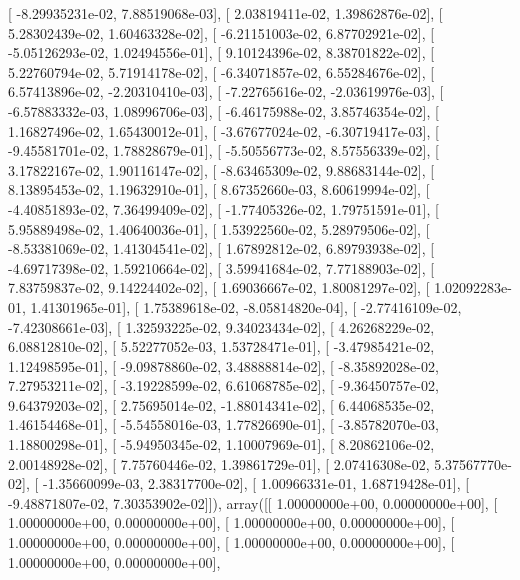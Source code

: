 \documentclass{article}
\begin{document}
       [ -8.29935231e-02,   7.88519068e-03],
       [  2.03819411e-02,   1.39862876e-02],
       [  5.28302439e-02,   1.60463328e-02],
       [ -6.21151003e-02,   6.87702921e-02],
       [ -5.05126293e-02,   1.02494556e-01],
       [  9.10124396e-02,   8.38701822e-02],
       [  5.22760794e-02,   5.71914178e-02],
       [ -6.34071857e-02,   6.55284676e-02],
       [  6.57413896e-02,  -2.20310410e-03],
       [ -7.22765616e-02,  -2.03619976e-03],
       [ -6.57883332e-03,   1.08996706e-03],
       [ -6.46175988e-02,   3.85746354e-02],
       [  1.16827496e-02,   1.65430012e-01],
       [ -3.67677024e-02,  -6.30719417e-03],
       [ -9.45581701e-02,   1.78828679e-01],
       [ -5.50556773e-02,   8.57556339e-02],
       [  3.17822167e-02,   1.90116147e-02],
       [ -8.63465309e-02,   9.88683144e-02],
       [  8.13895453e-02,   1.19632910e-01],
       [  8.67352660e-03,   8.60619994e-02],
       [ -4.40851893e-02,   7.36499409e-02],
       [ -1.77405326e-02,   1.79751591e-01],
       [  5.95889498e-02,   1.40640036e-01],
       [  1.53922560e-02,   5.28979506e-02],
       [ -8.53381069e-02,   1.41304541e-02],
       [  1.67892812e-02,   6.89793938e-02],
       [ -4.69717398e-02,   1.59210664e-02],
       [  3.59941684e-02,   7.77188903e-02],
       [  7.83759837e-02,   9.14224402e-02],
       [  1.69036667e-02,   1.80081297e-02],
       [  1.02092283e-01,   1.41301965e-01],
       [  1.75389618e-02,  -8.05814820e-04],
       [ -2.77416109e-02,  -7.42308661e-03],
       [  1.32593225e-02,   9.34023434e-02],
       [  4.26268229e-02,   6.08812810e-02],
       [  5.52277052e-03,   1.53728471e-01],
       [ -3.47985421e-02,   1.12498595e-01],
       [ -9.09878860e-02,   3.48888814e-02],
       [ -8.35892028e-02,   7.27953211e-02],
       [ -3.19228599e-02,   6.61068785e-02],
       [ -9.36450757e-02,   9.64379203e-02],
       [  2.75695014e-02,  -1.88014341e-02],
       [  6.44068535e-02,   1.46154468e-01],
       [ -5.54558016e-03,   1.77826690e-01],
       [ -3.85782070e-03,   1.18800298e-01],
       [ -5.94950345e-02,   1.10007969e-01],
       [  8.20862106e-02,   2.00148928e-02],
       [  7.75760446e-02,   1.39861729e-01],
       [  2.07416308e-02,   5.37567770e-02],
       [ -1.35660099e-03,   2.38317700e-02],
       [  1.00966331e-01,   1.68719428e-01],
       [ -9.48871807e-02,   7.30353902e-02]]), array([[  1.00000000e+00,   0.00000000e+00],
       [  1.00000000e+00,   0.00000000e+00],
       [  1.00000000e+00,   0.00000000e+00],
       [  1.00000000e+00,   0.00000000e+00],
       [  1.00000000e+00,   0.00000000e+00],
       [  1.00000000e+00,   0.00000000e+00],
\end{document}
